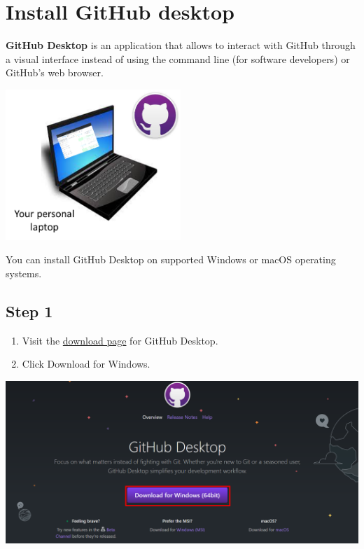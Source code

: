 \documentclass[
  letterpaper,
  DIV=11,
  numbers=noendperiod,
  oneside]{scrreprt}
\providecommand{\tightlist}{%
  \setlength{\itemsep}{0pt}\setlength{\parskip}{0pt}}\usepackage{longtable,booktabs,array}
\begin{document}
\hypertarget{sec-GitHub-Desktop-installation}{%
\section{Install GitHub desktop}\label{sec-GitHub-Desktop-installation}}

\textbf{GitHub Desktop} is an application that allows to interact with
GitHub through a visual interface instead of using the command line (for
software developers) or GitHub's web browser.

\includegraphics[width=2.60417in,height=\textheight]{images/paste-9238B1AB.png}

You can install GitHub Desktop on supported Windows or macOS operating
systems.

\subsection{Step 1}

\begin{enumerate}
\def\labelenumi{\arabic{enumi}.}
\tightlist
\item
  Visit the \href{https://desktop.github.com/}{download page} for GitHub
  Desktop.
\item
  Click Download for Windows.
\end{enumerate}

\includegraphics{images/paste-465BAC3C.png}
\end{document}
